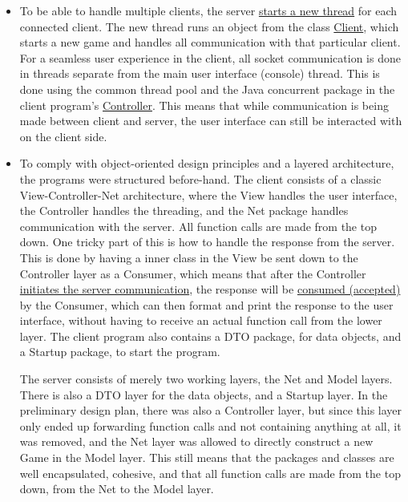 \documentclass[a4paper]{scrartcl}
\begin{document}
\begin{itemize}
    \item To be able to handle multiple clients, the server \href{https://github.com/fongie/Hangman/blob/50fc79c8c3e3d40953705370cbfbb7dee6867700/hangmanserver/src/main/java/net/Server.java#L53}{starts a new thread} for each connected client. The new thread runs an object from the class \href{https://github.com/fongie/Hangman/blob/master/hangmanserver/src/main/java/net/Client.java}{Client}, which starts a new game and handles all communication with that particular client. For a seamless user experience in the client, all socket communication is done in threads separate from the main user interface (console) thread. This is done using the common thread pool and the Java concurrent package in the client program's \href{https://github.com/fongie/Hangman/blob/master/hangmanclient/src/main/java/contr/Controller.java}{Controller}. This means that while communication is being made between client and server, the user interface can still be interacted with on the client side.
    
    \item To comply with object-oriented design principles and a layered architecture, the programs were structured before-hand. The client consists of a classic View-Controller-Net architecture, where the View handles the user interface, the Controller handles the threading, and the Net package handles communication with the server. All function calls are made from the top down. One tricky part of this is how to handle the response from the server. This is done by having a inner class in the View be sent down to the Controller layer as a Consumer, which means that after the Controller \href{https://github.com/fongie/Hangman/blob/50fc79c8c3e3d40953705370cbfbb7dee6867700/hangmanclient/src/main/java/contr/Controller.java#L35}{initiates the server communication}, the response will be \href{https://github.com/fongie/Hangman/blob/50fc79c8c3e3d40953705370cbfbb7dee6867700/hangmanclient/src/main/java/view/UserInterface.java#L86}{consumed (accepted)} by the Consumer, which can then format and print the response to the user interface, without having to receive an actual function call from the lower layer. The client program also contains a DTO package, for data objects, and a Startup package, to start the program.

        The server consists of merely two working layers, the Net and Model layers. There is also a DTO layer for the data objects, and a Startup layer. In the preliminary design plan, there was also a Controller layer, but since this layer only ended up forwarding function calls and not containing anything at all, it was removed, and the Net layer was allowed to directly construct a new Game in the Model layer. This still means that the packages and classes are well encapsulated, cohesive, and that all function calls are made from the top down, from the Net to the Model layer.

\end{itemize}
\end{document}
